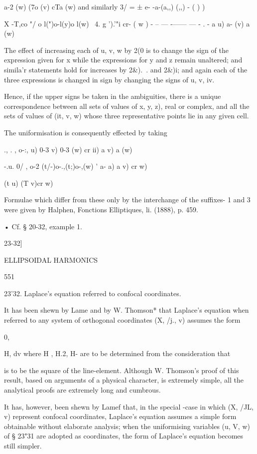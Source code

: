 {{{a-2 (w) (7o (v) cTa (w) and similarly 3/ = ± e- -a-(a,,) (,,) - ( ) )

X -T,co "/ o l(")o-l(y)o l(w) \ 4. g ').'"i cr- ( w ) - -- — -—— — - .
- a u) a- (v) a (w)

The effect of increasing each of u, v, w by 2(0 is to change the sign
of the expression given for x while the expressions for y and z remain
unaltered; and simila'r statements hold for increases by 2\&).\ . and
2\&)i; and again each of the three expressions is changed in sign by
changing the signs of u, v, iv.

Hence, if the upper signs be taken in the ambiguities, there is a
unique correspondence between all sets of values of x, y, z), real or
complex, and all the sets of values of (it, v, w) whose three
representative points lie in any given cell.

The uniformisation is consequently effected by taking

., . , o-:, u) 0-3 v) 0-3 (w) cr ii) a v) a (w)

-.u. 0/ , o-2 (t/-)o-.,(t;)o-,(w) ' a- a) a v) cr w)

(t u) (T v)cr w)

Formulae which differ from these only by the interchange of the
suffixes- 1 and 3 were given by Halphen, Fonctions Elliptiques, li.
(1888), p. 459.

• Cf. § 20-32, example 1.

23-32]

ELLIPSOIDAL HARMONICS

551

23'32. Laplace's equation referred to confocal coordinates.

It has been shewn by Lame and by W. Thomson* that Laplace's equation
when referred to any system of orthogonal coordinates (X, /j., v)
assumes the form

0,

H, dv where H , H.2, H- are to be determined from the consideration
that

is to be the square of the line-element. Although W. Thomson's proof
of this result, based on arguments of a physical character, is
extremely simple, all the analytical proofs are extremely long and
cumbrous.

It has, however, been shewn by Lamef that, in the special -case in
which (X, /JL, v) represent confocal coordinates, Laplace's equation
assumes a simple form obtainable without elaborate analysis; when the
uniformising variables (u, V, w) of § 23"31 are adopted as
coordinates, the form of Laplace's equation becomes still simpler.

}}}

